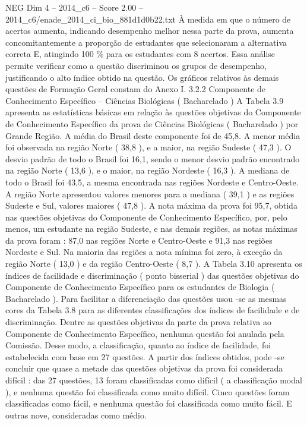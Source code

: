 \begin{textsample}{NEG Dim 4 – 2014\_c6 – Score 2.00 – 2014\_c6/enade\_2014\_ci\_bio\_881d1d0b22.txt}
À medida em que o número de acertos aumenta, indicando desempenho melhor nessa parte da prova, aumenta concomitantemente a proporção de estudantes que selecionaram a alternativa correta E, atingindo 100 \% para os estudantes com 8 acertos.
Essa análise permite verificar como a questão discriminou os grupos de desempenho, justificando o alto índice obtido na questão.
Os gráficos relativos às demais questões de Formação Geral constam do Anexo I. 3.2.2 Componente de Conhecimento Específico – Ciências Biológicas ( Bacharelado ) A Tabela 3.9 apresenta as estatísticas básicas em relação às questões objetivas do Componente de Conhecimento Específico da prova de Ciências Biológicas ( Bacharelado ) por Grande Região.
A média do Brasil deste componente foi de 45,8.
A menor média foi observada na região Norte ( 38,8 ), e a maior, na região Sudeste ( 47,3 ).
O desvio padrão de todo o Brasil foi 16,1, sendo o menor desvio padrão encontrado na região Norte ( 13,6 ), e o maior, na região Nordeste ( 16,3 ).
A mediana de todo o Brasil foi 43,5, a mesma encontrada nas regiões Nordeste e Centro-Oeste.
A região Norte apresentou valores menores para a mediana ( 39,1 ) e as regiões Sudeste e Sul, valores maiores ( 47,8 ).
A nota máxima da prova foi 95,7, obtida nas questões objetivas do Componente de Conhecimento Específico, por, pelo menos, um estudante na região Sudeste, e nas demais regiões, as notas máximas da prova foram : 87,0 nas regiões Norte e Centro-Oeste e 91,3 nas regiões Nordeste e Sul.
Na maioria das regiões a nota mínima foi zero, à exceção da região Norte ( 13,0 ) e da região Centro-Oeste ( 8,7 ).
A Tabela 3.10 apresenta os índices de facilidade e discriminação ( ponto bisserial ) das questões objetivas do Componente de Conhecimento Específico para os estudantes de Biologia ( Bacharelado ).
Para facilitar a diferenciação das questões usou -se as mesmas cores da Tabela 3.8 para as diferentes classificações dos índices de facilidade e de discriminação.
Dentre as questões objetivas da parte da prova relativa ao Componente de Conhecimento Específico, nenhuma questão foi anulada pela Comissão.
Desse modo, a classificação, quanto ao índice de facilidade, foi estabelecida com base em 27 questões.
A partir dos índices obtidos, pode -se concluir que quase a metade das questões objetivas da prova foi considerada difícil : das 27 questões, 13 foram classificadas como difícil ( a classificação modal ), e nenhuma questão foi classificada como muito difícil.
Cinco questões foram classificadas como fácil, e nenhuma questão foi classificada como muito fácil.
E outras nove, consideradas como médio.

\end{textsample}

